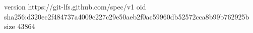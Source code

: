 version https://git-lfs.github.com/spec/v1
oid sha256:d320ec2f484737a4009c227c29e50aeb2f0ac59960db52572cca8b99b762925b
size 43864
